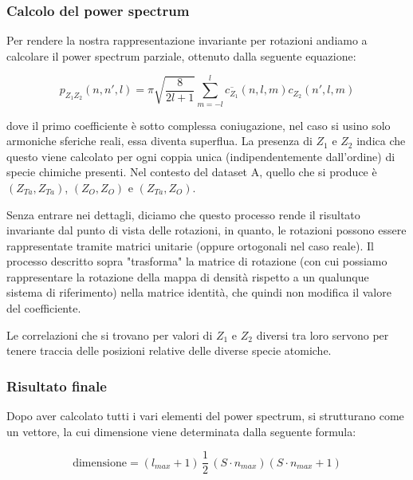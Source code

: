 \documentclass[a4paper,11pt,openany]{book}
\begin{document}
\subsubsection{Calcolo del power spectrum}

Per rendere la nostra rappresentazione invariante per rotazioni andiamo a calcolare il power spectrum parziale, ottenuto dalla seguente equazione:

\begin{equation}
    p_{Z_1Z_2}(n,n',l) = \pi \sqrt{\frac{8}{2l+1}} \sum_{m=-l}^{l} \overline{c_{Z_1}}(n,l,m) c_{Z_2}(n',l,m)
    \label{eq:power-spectrum}
\end{equation}

dove il primo coefficiente è sotto complessa coniugazione, nel caso si usino solo armoniche sferiche reali, essa diventa superflua. La presenza di $Z_1$ e $Z_2$ indica che questo viene calcolato per ogni coppia unica (indipendentemente dall'ordine) di specie chimiche presenti. Nel contesto del dataset A, quello che si produce è $(Z_{Ta},Z_{Ta})$, $(Z_{O},Z_{O})$ e $(Z_{Ta},Z_{O})$.

Senza entrare nei dettagli, diciamo che questo processo rende il risultato invariante dal punto di vista delle rotazioni, in quanto, le rotazioni possono essere rappresentate tramite matrici unitarie (oppure ortogonali nel caso reale). Il processo descritto sopra "trasforma" la matrice di rotazione (con cui possiamo rappresentare la rotazione della mappa di densità rispetto a un qualunque sistema di riferimento) nella matrice identità, che quindi non modifica il valore del coefficiente.

Le correlazioni che si trovano per valori di $Z_1$ e $Z_2$ diversi tra loro servono per tenere traccia delle posizioni relative delle diverse specie atomiche.

\subsubsection{Risultato finale}

Dopo aver calcolato tutti i vari elementi del power spectrum, si strutturano come un vettore, la cui dimensione viene determinata dalla seguente formula:

\begin{equation}
    \mathrm{dimensione} = (l_{max} + 1) \,\frac{1}{2}\, (S\cdot n_{max}) (S\cdot n_{max} +1)
    \label{eq:formula-dimensione-semplificata}
\end{equation}
\end{document}
